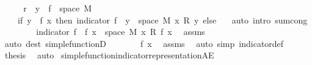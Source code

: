 \begin{isabellebody}
\ {\isacharminus}{\kern0pt}\isanewline
\ \ \isamarkupfalse%
\ {\isachardoublequoteopen}{\isacharquery}{\kern0pt}r\ {\isacharequal}{\kern0pt}\ {\isacharparenleft}{\kern0pt}{\isasymSum}y\ {\isasymin}\ f\ {\isacharbackquote}{\kern0pt}\ space\ M{\isachardot}{\kern0pt}\isanewline
\ \ \ \ {\isacharparenleft}{\kern0pt}if\ y\ {\isacharequal}{\kern0pt}\ f\ x\ then\ indicator\ {\isacharparenleft}{\kern0pt}f\ {\isacharminus}{\kern0pt}{\isacharbackquote}{\kern0pt}\ {\isacharbraceleft}{\kern0pt}y{\isacharbraceright}{\kern0pt}\ {\isasyminter}\ space\ M{\isacharparenright}{\kern0pt}\ x\ {\isacharasterisk}{\kern0pt}\isactrlsub R\ y\ else\ {}{\isacharparenright}{\kern0pt}{\isacharparenright}{\kern0pt}{\isachardoublequoteclose}\ \isamarkupfalse%
\ {\isacharparenleft}{\kern0pt}auto\ intro{\isacharbang}{\kern0pt}{\isacharcolon}{\kern0pt}\ sum{\isachardot}{\kern0pt}cong{\isacharparenright}{\kern0pt}\isanewline
\ \ \isamarkupfalse%
\ \isamarkupfalse%
\ {\isachardoublequoteopen}{\isachardot}{\kern0pt}{\isachardot}{\kern0pt}{\isachardot}{\kern0pt}\ {\isacharequal}{\kern0pt}\ \ indicator\ {\isacharparenleft}{\kern0pt}f\ {\isacharminus}{\kern0pt}{\isacharbackquote}{\kern0pt}\ {\isacharbraceleft}{\kern0pt}f\ x{\isacharbraceright}{\kern0pt}\ {\isasyminter}\ space\ M{\isacharparenright}{\kern0pt}\ x\ {\isacharasterisk}{\kern0pt}\isactrlsub R\ f\ x{\isachardoublequoteclose}\ \isamarkupfalse%
\ assms\ \isamarkupfalse%
\ {\isacharparenleft}{\kern0pt}auto\ dest{\isacharcolon}{\kern0pt}\ simple{\isacharunderscore}{\kern0pt}functionD{\isacharparenright}{\kern0pt}\isanewline
\ \ \isamarkupfalse%
\ \isamarkupfalse%
\ {\isachardoublequoteopen}{\isachardot}{\kern0pt}{\isachardot}{\kern0pt}{\isachardot}{\kern0pt}\ {\isacharequal}{\kern0pt}\ f\ x{\isachardoublequoteclose}\ \isamarkupfalse%
\ assms\ \isamarkupfalse%
\ {\isacharparenleft}{\kern0pt}auto\ simp{\isacharcolon}{\kern0pt}\ indicator{\isacharunderscore}{\kern0pt}def{\isacharparenright}{\kern0pt}\isanewline
\ \ \isamarkupfalse%
\ \isamarkupfalse%
\ {\isacharquery}{\kern0pt}thesis\ \isamarkupfalse%
\ auto\isanewline
{}\isamarkupfalse%
%
\endisatagproof
{\isafoldproof}%
%
\isadelimproof
\isanewline
%
\endisadelimproof
\isanewline
{}\isamarkupfalse%
\ simple{\isacharunderscore}{\kern0pt}function{\isacharunderscore}{\kern0pt}indicator{\isacharunderscore}{\kern0pt}representation{\isacharunderscore}{\kern0pt}AE{\isacharcolon}{\kern0pt}\isanewline

\end{isabellebody}

